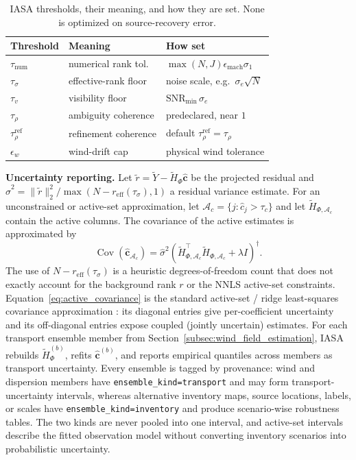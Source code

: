 \begin{table}[t]
\centering
\small
\setlength{\tabcolsep}{3pt}
\caption{IASA thresholds, their meaning, and how they are set.  None is
optimized on source-recovery error.}
\label{tab:thresholds}
\begin{tabular}{lll}
\toprule
Threshold & Meaning & How set \\
\midrule
\(\tau_{\mathrm{num}}\) & numerical rank tol.\ & \(\max(N,J)\epsilon_{\mathrm{mach}}\sigma_1\) \\
\(\tau_\sigma\) & effective-rank floor & noise scale, e.g.\ \(\sigma_e\sqrt N\) \\
\(\tau_v\) & visibility floor & \(\mathrm{SNR}_{\min}\,\sigma_e\) \\
\(\tau_\rho\) & ambiguity coherence & predeclared, near \(1\) \\
\(\tau_\rho^{\mathrm{ref}}\) & refinement coherence & default \(\tau_\rho^{\mathrm{ref}}=\tau_\rho\) \\
\(\epsilon_w\) & wind-drift cap & physical wind tolerance \\
\bottomrule
\end{tabular}
\end{table}

\noindent\textbf{Uncertainty reporting.}
Let \(\widetilde r=\widetilde Y-\widetilde H_\Phi\widehat{\mathbf c}\) be the
projected residual and
\(\widehat\sigma^2=\|\widetilde r\|_2^2/\max(N-r_{\mathrm{eff}}(\tau_\sigma),1)\)
a residual variance estimate.  For an unconstrained or active-set approximation,
let \(\mathcal A_c=\{j:\widehat c_j>\tau_c\}\) and let
\(\widetilde H_{\Phi,\mathcal A_c}\) contain the active columns.  The covariance
of the active estimates is approximated by
\begin{equation}
\operatorname{Cov}(\widehat{\mathbf c}_{\mathcal A_c})
=
\widehat\sigma^2
(\widetilde H_{\Phi,\mathcal A_c}^\top
\widetilde H_{\Phi,\mathcal A_c}+\lambda I)^\dagger.
\label{eq:active_covariance}
\end{equation}
The use of \(N-r_{\mathrm{eff}}(\tau_\sigma)\) is a heuristic degrees-of-freedom
count that does not exactly account for the background rank \(r\) or the NNLS
active-set constraints.  Equation~\ref{eq:active_covariance} is the standard
active-set / ridge least-squares covariance approximation
\citep{seber2003linear}: its diagonal entries give per-coefficient uncertainty
and its off-diagonal entries expose coupled (jointly uncertain) estimates.  For
each transport ensemble member from
Section~\ref{subsec:wind_field_estimation}, IASA rebuilds
\(\widetilde H_\Phi^{(b)}\), refits \(\widehat{\mathbf c}^{(b)}\), and reports
empirical quantiles across members as transport uncertainty.  Every ensemble is
tagged by provenance: wind and dispersion members have
\texttt{ensemble\_kind=transport} and may form transport-uncertainty intervals,
whereas alternative inventory maps, source locations, labels, or scales have
\texttt{ensemble\_kind=inventory} and produce scenario-wise robustness tables.
The two kinds are never pooled into one interval, and active-set intervals
describe the fitted observation model without converting inventory scenarios into
probabilistic uncertainty.

